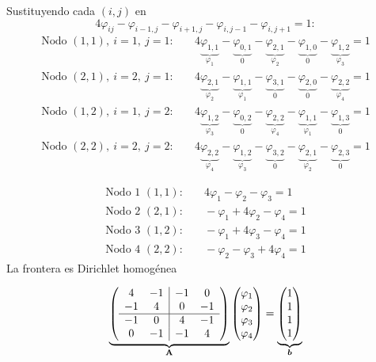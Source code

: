Sustituyendo cada $(i, j)$ en
\[
4\varphi_{ij} - \varphi_{i-1,j} - \varphi_{i+1,j} - \varphi_{i,j-1} - \varphi_{i,j+1} = 1 :
\]
\begin{align*}
	\text{Nodo } (1,1),\ i = 1,\ j = 1:&\quad 4\underbrace{\varphi_{1,1}}_{\varphi_1} - \underbrace{\varphi_{0,1}}_{0}
	- \underbrace{\varphi_{2,1}}_{\varphi_2} - \underbrace{\varphi_{1,0}}_{0} - \underbrace{\varphi_{1,2}}_{\varphi_3} = 1\\
	\text{Nodo } (2,1),\ i = 2,\ j = 1:&\quad 4\underbrace{\varphi_{2,1}}_{\varphi_2} - \underbrace{\varphi_{1,1}}_{\varphi_1}
	- \underbrace{\varphi_{3,1}}_{0} - \underbrace{\varphi_{2,0}}_{0} - \underbrace{\varphi_{2,2}}_{\varphi_4} = 1\\
	\text{Nodo } (1,2),\ i = 1,\ j = 2:&\quad 4\underbrace{\varphi_{1,2}}_{\varphi_3} - \underbrace{\varphi_{0,2}}_{0}
	- \underbrace{\varphi_{2,2}}_{\varphi_4} - \underbrace{\varphi_{1,1}}_{\varphi_1} - \underbrace{\varphi_{1,3}}_{0} = 1\\
	\text{Nodo } (2,2),\ i = 2,\ j = 2:&\quad 4\underbrace{\varphi_{2,2}}_{\varphi_4} - \underbrace{\varphi_{1,2}}_{\varphi_3}
	- \underbrace{\varphi_{3,2}}_{0} - \underbrace{\varphi_{2,1}}_{\varphi_2} - \underbrace{\varphi_{2,3}}_{0} = 1
\end{align*}

\begin{align*}
	\text{Nodo 1 } (1,1):&\quad 4\varphi_1 - \varphi_2 - \varphi_3 = 1\\
	\text{Nodo 2 } (2,1):&\quad -\varphi_1 + 4\varphi_2 - \varphi_4 = 1\\
	\text{Nodo 3 } (1,2):&\quad -\varphi_1 + 4\varphi_3 - \varphi_4 = 1\\
	\text{Nodo 4 } (2,2):&\quad -\varphi_2 - \varphi_3 + 4\varphi_4 = 1
\end{align*}
La frontera es Dirichlet homogénea

\[
\underbrace{\left(\begin{array}{cc|cc}
		4 & -1 & -1 &  0\\
		-1 &  4 &  0 & -1\\ \hline
		-1 &  0 &  4 & -1\\
		0 & -1 & -1 &  4
	\end{array}\right)}_{\mathbf{A}}
\begin{pmatrix} \varphi_1\\ \varphi_2\\ \varphi_3\\ \varphi_4 \end{pmatrix}
= \underbrace{\begin{pmatrix} 1\\ 1\\ 1\\ 1 \end{pmatrix}}_{\bm{b}}
\]

